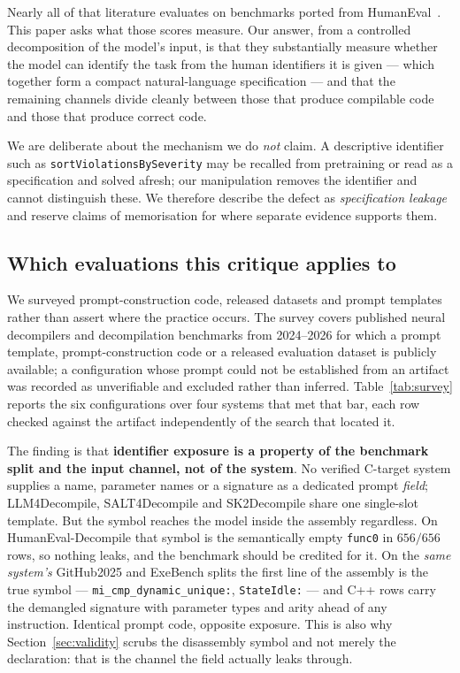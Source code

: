 \documentclass[conference]{IEEEtran}
\begin{document}
Nearly all of that literature evaluates on benchmarks ported from
HumanEval~\cite{chen2021evaluating}. This paper asks what those scores measure.
Our answer, from a controlled decomposition of the model's input, is that they
substantially measure whether the model can identify the task from the human
identifiers it is given --- which together form a compact natural-language
specification --- and that the remaining channels divide cleanly between those
that produce compilable code and those that produce correct code.

We are deliberate about the mechanism we do \emph{not} claim. A descriptive
identifier such as \texttt{sortViolationsBySeverity} may be recalled from
pretraining or read as a specification and solved afresh; our manipulation
removes the identifier and cannot distinguish these. We therefore describe the
defect as \emph{specification leakage} and reserve claims of memorisation for
where separate evidence supports them.

\subsection{Which evaluations this critique applies to}
\label{sec:scope}
We surveyed prompt-construction code, released datasets and prompt templates
rather than assert where the practice occurs. The survey covers published neural
decompilers and decompilation benchmarks from 2024--2026 for which a prompt
template, prompt-construction code or a released evaluation dataset is publicly
available; a configuration whose prompt could not be established from an artifact
was recorded as unverifiable and excluded rather than inferred.
Table~\ref{tab:survey} reports the six configurations over four systems that met
that bar, each row checked against the artifact independently of the search that
located it.

The finding is that \textbf{identifier exposure is a property of the benchmark
split and the input channel, not of the system}. No verified C-target system
supplies a name, parameter names or a signature as a dedicated prompt
\emph{field}; LLM4Decompile, SALT4Decompile and SK2Decompile share one
single-slot template. But the symbol reaches the model inside the assembly
regardless. On HumanEval-Decompile that symbol is the semantically empty
\texttt{func0} in $656/656$ rows, so nothing leaks, and the benchmark should be
credited for it. On the \emph{same system's} GitHub2025 and ExeBench splits the
first line of the assembly is the true symbol ---
\texttt{mi\_cmp\_dynamic\_unique:}, \texttt{StateIdle:} --- and C++ rows carry the
demangled signature with parameter types and arity ahead of any instruction.
Identical prompt code, opposite exposure. This is also why
Section~\ref{sec:validity} scrubs the disassembly symbol and not merely the
declaration: that is the channel the field actually leaks through.
\end{document}
